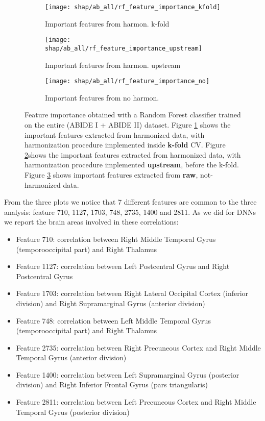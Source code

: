 \documentclass[11pt]{report}
\begin{document}
\begin{figure}
\centering
\begin{subfigure}[b]{.45\textwidth}
   \texttt{[image: shap/ab\_all/rf\_feature\_importance\_kfold]}
   \caption{Important features from harmon. k-fold}
    \label{fig:rf_featimpo_kfold}
\end{subfigure}
\begin{subfigure}[b]{.45\textwidth}
   \texttt{[image: shap/ab\_all/rf\_feature\_importance\_upstream]}
   \caption{Important features from harmon. upstream}
    \label{fig:rf_featimpo_upstream}
\end{subfigure}
\begin{subfigure}[b]{.45\textwidth}
   \texttt{[image: shap/ab\_all/rf\_feature\_importance\_no]}
   \caption{Important features from no harmon.}
   \label{fig:rf_featimpo_no}
\end{subfigure}
\caption{Feature importance obtained with a Random Forest classifier trained on the entire (ABIDE I + ABIDE II) dataset.
Figure \ref{fig:rf_featimpo_kfold} shows the important features extracted from harmonized data, with harmonization procedure implemented inside \textbf{k-fold} CV.
Figure \ref{fig:rf_featimpo_upstream}shows the important features extracted from harmonized data, with harmonization procedure implemented \textbf{upstream}, before the k-fold.
Figure \ref{fig:rf_featimpo_no} shows important features extracted from \textbf{raw}, not-harmonized data.
}
\label{fig:shap_abide_rf_all}
\end{figure}


From the three plots we notice that 7 different features are common to the three analysis: feature 710, 1127, 1703, 748, 2735, 1400 and 2811.
As we did for DNNs we report the brain areas involved in these correlations:
\begin{itemize}
\item Feature 710: correlation between Right Middle Temporal Gyrus (temporooccipital part) and Right Thalamus
\item Feature 1127: correlation between Left Postcentral Gyrus  and Right Postcentral Gyrus
\item Feature 1703: correlation between Right Lateral Occipital Cortex (inferior division) and Right Supramarginal Gyrus (anterior division)
\item Feature 748: correlation between Left Middle Temporal Gyrus (temporooccipital part) and Right Thalamus
\item Feature 2735: correlation between Right Precuneous Cortex  and Right Middle Temporal Gyrus (anterior division)
\item Feature 1400: correlation between Left Supramarginal Gyrus (posterior division) and Right Inferior Frontal Gyrus (pars triangularis)
\item Feature 2811: correlation between Left Precuneous Cortex  and Right Middle Temporal Gyrus (posterior division)
\end{itemize}
\end{document}
